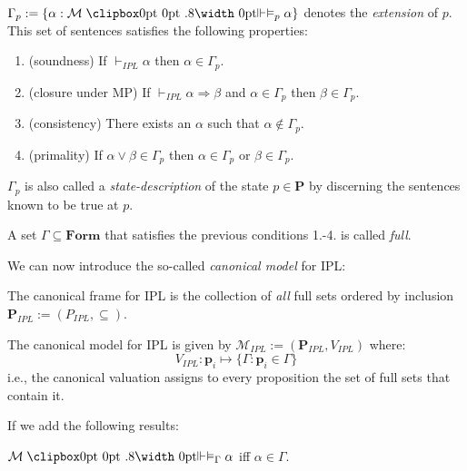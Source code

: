 	\begin{definition}[extension of $p$]
		 $\Gamma_p := \{ \alpha : \mathcal{M} \VDashA_p \alpha \}$ denotes the \emph{extension} of $p$.
		This set of sentences satisfies the following properties:
		\begin{enumerate}
			\item (soundness) If $\vdash_{IPL} \alpha$ then $\alpha \in \Gamma_p$.
			\item (closure under MP) If $\vdash_{IPL} \alpha \Rightarrow \beta$ and $\alpha \in \Gamma_p$ then $\beta \in \Gamma_p$.
			\item (consistency) There exists an $\alpha$ such that $\alpha \notin \Gamma_p$.
			\item (primality) If $\alpha \lor \beta \in \Gamma_p$ then $\alpha \in \Gamma_p$ or $\beta \in \Gamma_p$.
		\end{enumerate}
	\end{definition}
	
		$\Gamma_p$ is also called a \emph{state-description} of the state $p\in \textbf{P}$ by discerning the sentences known to be true at $p$.
	
	\begin{definition}
		A set $\Gamma \subseteq \textbf{Form}$ that satisfies the previous conditions 1.-4. is called \emph{full}.
	\end{definition}
	
	We can now introduce the so-called \emph{canonical model} for IPL:
	
	\begin{definition}
		The canonical frame for IPL is the collection of \emph{all} full sets ordered by inclusion $\textbf{P}_{IPL} := (P_{IPL}, \subseteq)$.
	\end{definition}
	
	\begin{definition}
		The canonical model for IPL is given by $\mathcal{M}_{IPL}:=(\textbf{P}_{IPL}, V_{IPL})$ where:
		\begin{equation*}
			V_{IPL} : \textbf{p}_i \mapsto \{\Gamma: \textbf{p}_i \in \Gamma\}
		\end{equation*}
		i.e., the canonical valuation assigns to every proposition the set of full sets that contain it.
	\end{definition}
	
	If we add the following results:
	
	\begin{lem}
		$\mathcal{M} \VDashA_\Gamma \alpha$ iff $\alpha \in \Gamma$.
	\end{lem}
	
